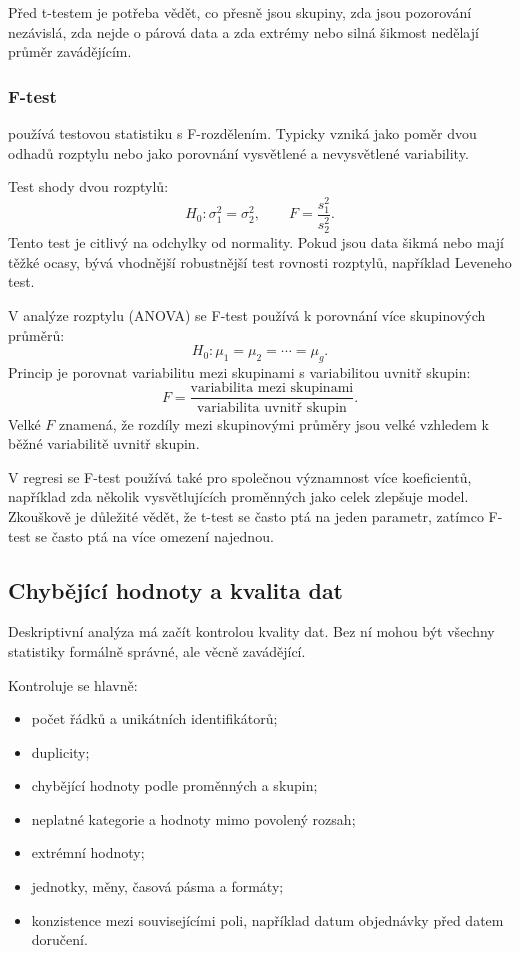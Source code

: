 Před t-testem je potřeba vědět, co přesně jsou skupiny, zda jsou pozorování nezávislá, zda nejde o
párová data a zda extrémy nebo silná šikmost nedělají průměr zavádějícím.

\subsubsection{F-test}
 používá testovou statistiku s F-rozdělením. Typicky vzniká jako poměr dvou odhadů
rozptylu nebo jako porovnání vysvětlené a nevysvětlené variability.

Test shody dvou rozptylů:
\[
  H_0:\sigma_1^2=\sigma_2^2,
  \qquad
  F=\frac{s_1^2}{s_2^2}.
\]
Tento test je citlivý na odchylky od normality. Pokud jsou data šikmá nebo mají těžké ocasy, bývá
vhodnější robustnější test rovnosti rozptylů, například Leveneho test.

V analýze rozptylu (ANOVA) se F-test používá k porovnání více skupinových průměrů:
\[
  H_0:\mu_1=\mu_2=\cdots=\mu_g.
\]
Princip je porovnat variabilitu mezi skupinami s variabilitou uvnitř skupin:
\[
  F=\frac{\text{variabilita mezi skupinami}}{\text{variabilita uvnitř skupin}}.
\]
Velké \(F\) znamená, že rozdíly mezi skupinovými průměry jsou velké vzhledem k běžné variabilitě uvnitř
skupin.

V regresi se F-test používá také pro společnou významnost více koeficientů, například zda několik
vysvětlujících proměnných jako celek zlepšuje model. Zkouškově je důležité vědět, že t-test se často
ptá na jeden parametr, zatímco F-test se často ptá na více omezení najednou.

\subsection{Chybějící hodnoty a kvalita dat}
Deskriptivní analýza má začít kontrolou kvality dat. Bez ní mohou být všechny statistiky formálně
správné, ale věcně zavádějící.

Kontroluje se hlavně:
\begin{itemize}
  \item počet řádků a unikátních identifikátorů;
  \item duplicity;
  \item chybějící hodnoty podle proměnných a skupin;
  \item neplatné kategorie a hodnoty mimo povolený rozsah;
  \item extrémní hodnoty;
  \item jednotky, měny, časová pásma a formáty;
  \item konzistence mezi souvisejícími poli, například datum objednávky před datem doručení.
\end{itemize}

